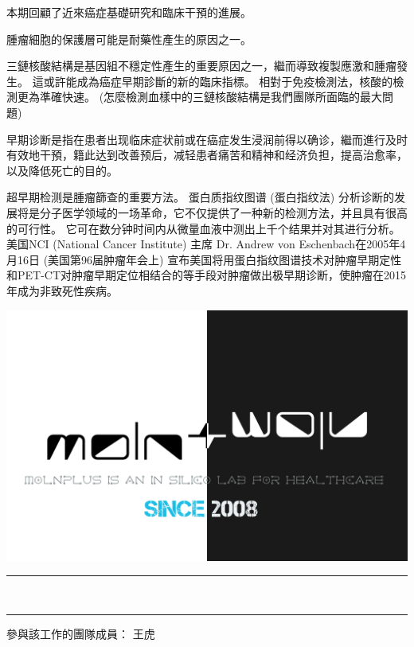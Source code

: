 \documentclass[10pt,a4paper]{article}
\newcommand{\HorRule}[1]{\noindent\rule{\linewidth}{#1}} %
\begin{document}
\begin{multicols}{2}
本期回顧了近來癌症基礎研究和臨床干預的進展。

腫瘤細胞的保護層可能是耐藥性產生的原因之一。

三鏈核酸結構是基因組不穩定性產生的重要原因之一，繼而導致複製應激和腫瘤發生。
這或許能成為癌症早期診斷的新的臨床指標。
相對于免疫檢測法，核酸的檢測更為準確快速。
(怎麼檢測血樣中的三鏈核酸結構是我們團隊所面臨的最大問題)

早期诊断是指在患者出现临床症状前或在癌症发生浸润前得以确诊，繼而進行及时有效地干預，籍此达到改善预后，减轻患者痛苦和精神和经济负担，提高治愈率，以及降低死亡的目的。

超早期检测是腫瘤篩查的重要方法。
蛋白质指纹图谱 (蛋白指纹法) 分析诊断的发展将是分子医学领域的一场革命，它不仅提供了一种新的检测方法，并且具有很高的可行性。
它可在数分钟时间内从微量血液中测出上千个结果并对其进行分析。
美国NCI (National Cancer Institute) 主席 Dr. Andrew von Eschenbach在2005年4月16日 (美国第96届肿瘤年会上) 宣布美国将用蛋白指纹图谱技术对肿瘤早期定性和PET-CT对肿瘤早期定位相结合的等手段对肿瘤做出极早期诊断，使肿瘤在2015年成为非致死性疾病。


\begin{center}
\includegraphics[width=1\linewidth]{molnplus.png} %
\end{center}

\end{multicols}


\begin{center}

\noindent\HorRule{3pt} \\[-0.75\baselineskip] %
\HorRule{1pt} %

參與該工作的團隊成員：
王虎
\end{center}

\newpage



\end{document}
